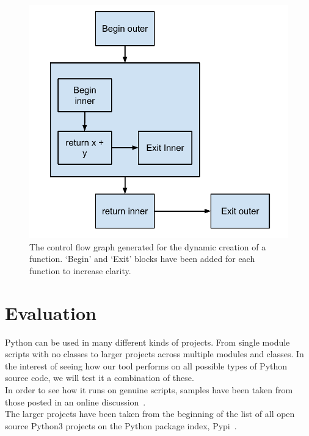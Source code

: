 \documentclass[12pt, titlepage]{article}
\begin{document}
\begin{figure}
\centering
\includegraphics[scale=0.7]{images/dynamicFunctionCFG.pdf}
\caption{The control flow graph generated for the dynamic creation of a function. `Begin' and `Exit' blocks have been added for each function to increase clarity.}
\label{fig:dynamicFuncCFG}
\end{figure}


\newpage
\section{Evaluation}
Python can be used in many different kinds of projects. From single module scripts with no classes to larger projects across multiple modules and classes. In the interest of seeing how our tool performs on  all possible types of Python source code, we will test it a combination of these. \\
\indent In order to see how it runs on genuine scripts, samples have been taken from those posted in an online discussion~\cite{pythonScripts}. \\
\indent The larger projects have been taken from the beginning of the list of all open source Python3 projects on the Python package index, Pypi~\cite{python3Projects}.
\end{document}
